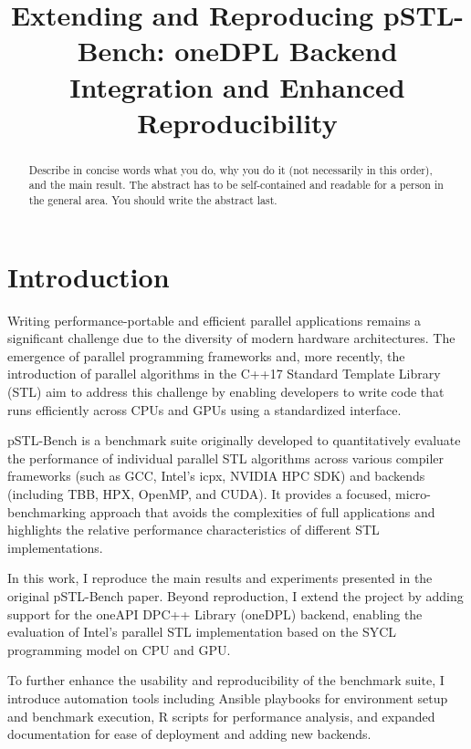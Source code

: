 \documentclass[conference]{IEEEtran}
\begin{document}
\title{Extending and Reproducing pSTL-Bench: oneDPL Backend Integration and Enhanced Reproducibility}

\author{
}

\maketitle

\begin{abstract}
  Describe in concise words what you do, why you do it (not necessarily
  in this order), and the main result.  The abstract has to be
  self-contained and readable for a person in the general area. You
  should write the abstract last.
\end{abstract}

\section{Introduction}\label{sec:intro}
Writing performance-portable and efficient parallel applications remains a
significant challenge due to the diversity of modern hardware architectures.
The emergence of parallel programming frameworks and, more recently, the
introduction of parallel algorithms in the C++17 Standard Template Library
(STL) aim to address this challenge by enabling developers to write code that
runs efficiently across CPUs and GPUs using a standardized interface.

pSTL-Bench\cite{pSTL-Bench} is a benchmark suite originally developed to
quantitatively evaluate the performance of individual parallel STL algorithms
across various compiler frameworks (such as GCC, Intel's icpx, NVIDIA HPC SDK)
and backends (including TBB, HPX, OpenMP, and CUDA). It provides a focused,
micro-benchmarking approach that avoids the complexities of full applications
and highlights the relative performance characteristics of different STL
implementations.

In this work, I reproduce the main results and experiments presented in the
original pSTL-Bench paper. Beyond reproduction, I extend the project by adding
support for the oneAPI DPC++ Library (oneDPL) backend, enabling the evaluation
of Intel’s parallel STL implementation based on the SYCL programming model on
CPU and GPU.

To further enhance the usability and reproducibility of the benchmark suite, I
introduce automation tools including Ansible playbooks for environment setup
and benchmark execution, R scripts for performance analysis, and expanded
documentation for ease of deployment and adding new backends.
\end{document}
